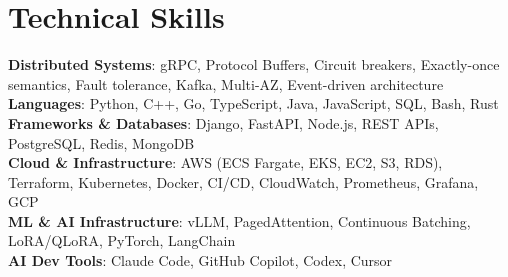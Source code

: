 \documentclass[letterpaper,11pt]{article}
\begin{document}
\section{Technical Skills}
\vspace{-7pt}
\begin{itemize}
[leftmargin=0.15in, label={}]\small{\item{
        \textbf{Distributed Systems}{: gRPC, Protocol Buffers, Circuit breakers, Exactly-once semantics, Fault tolerance, Kafka, Multi-AZ, Event-driven architecture} \\
        \textbf{Languages}{: Python, C++, Go, TypeScript, Java, JavaScript, SQL, Bash, Rust} \\
        \textbf{Frameworks \& Databases}{: Django, FastAPI, Node.js, REST APIs, PostgreSQL, Redis, MongoDB} \\
        \textbf{Cloud \& Infrastructure}{: AWS (ECS Fargate, EKS, EC2, S3, RDS), Terraform, Kubernetes, Docker, CI/CD, CloudWatch, Prometheus, Grafana, GCP} \\
        \textbf{ML \& AI Infrastructure}{: vLLM, PagedAttention, Continuous Batching, LoRA/QLoRA, PyTorch, LangChain} \\
        \textbf{AI Dev Tools}{: Claude Code, GitHub Copilot, Codex, Cursor} \\
}}
\end{itemize}
\end{document}
